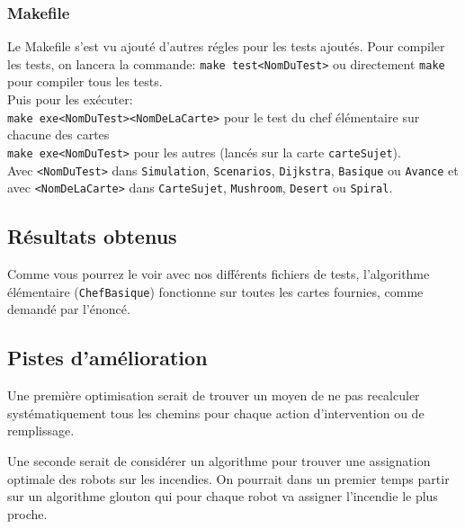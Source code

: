 \documentclass[a4paper,8pt]{article} %
\begin{document}
\subsubsection{Makefile}
Le Makefile s'est vu ajouté d'autres régles pour les tests ajoutés.
Pour compiler les tests, on lancera la commande: \texttt{make test<NomDuTest>} ou directement \texttt{make} pour compiler tous les tests. \\

Puis pour les exécuter: \\
\texttt{make exe<NomDuTest><NomDeLaCarte>} pour le test du chef élémentaire sur chacune des cartes\\
\texttt{make exe<NomDuTest>} pour les autres (lancés sur la carte \texttt{carteSujet}).\\

Avec \texttt{<NomDuTest>} dans \texttt{Simulation}, \texttt{Scenarios}, \texttt{Dijkstra}, \texttt{Basique} ou \texttt{Avance} et avec 
\texttt{<NomDeLaCarte>} dans \texttt{CarteSujet}, \texttt{Mushroom}, \texttt{Desert} ou \texttt{Spiral}.

\subsection{Résultats obtenus}
Comme vous pourrez le voir avec nos différents fichiers de tests, l'algorithme élémentaire (\texttt{ChefBasique}) fonctionne sur toutes les cartes 
fournies, comme demandé par l'énoncé.

\subsection{Pistes d'amélioration}
Une première optimisation serait de trouver un moyen de ne pas recalculer systématiquement tous les chemins pour chaque action d'intervention ou de remplissage.

Une seconde serait de considérer un algorithme pour trouver une assignation optimale des robots sur les incendies. On pourrait dans un premier temps partir sur un algorithme glouton qui pour chaque robot va assigner l'incendie le plus proche.
\end{document}
